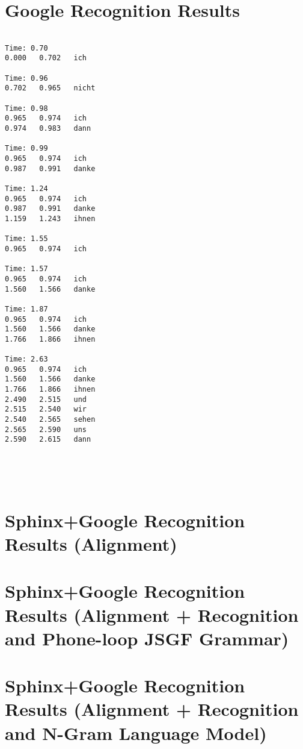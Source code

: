 \section {Google Recognition Results}
\begin{center}
\begin{lstlisting}[style=nonumbers]

Time: 0.70
0.000	0.702	ich

Time: 0.96
0.702	0.965	nicht

Time: 0.98
0.965	0.974	ich
0.974	0.983	dann

Time: 0.99
0.965	0.974	ich
0.987	0.991	danke

Time: 1.24
0.965	0.974	ich
0.987	0.991	danke
1.159	1.243	ihnen

Time: 1.55
0.965	0.974	ich

Time: 1.57
0.965	0.974	ich
1.560	1.566	danke

Time: 1.87
0.965	0.974	ich
1.560	1.566	danke
1.766	1.866	ihnen

Time: 2.63
0.965	0.974	ich
1.560	1.566	danke
1.766	1.866	ihnen
2.490	2.515	und
2.515	2.540	wir
2.540	2.565	sehen
2.565	2.590	uns
2.590	2.615	dann





\end{lstlisting}
\end{center}

\section {Sphinx+Google Recognition Results (Alignment)}
\section {Sphinx+Google Recognition Results (Alignment + Recognition and
Phone-loop JSGF Grammar)}
\section {Sphinx+Google Recognition Results (Alignment + Recognition and
N-Gram Language Model)}
